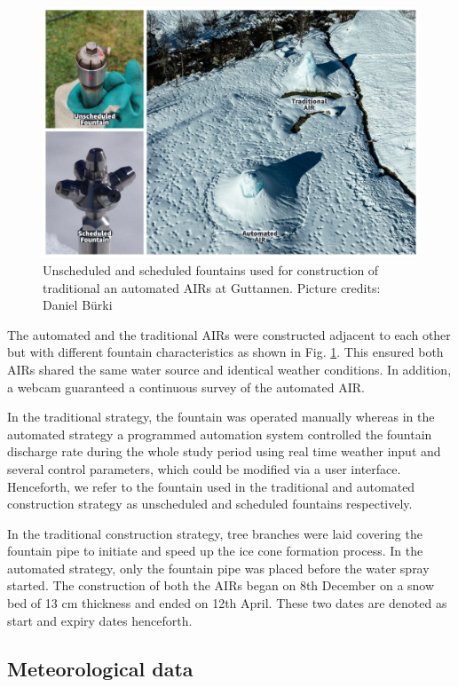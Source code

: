 \documentclass[tc, manuscript]{copernicus}
\begin{document}
\begin{figure}[t]
\includegraphics[width=12cm]{Figures/AIR_fountains.jpg}
\caption{Unscheduled and scheduled fountains used for construction of traditional an automated AIRs at Guttannen. Picture credits: Daniel Bürki}
\label{fig:2AIR}
\end{figure}

The automated and the traditional AIRs were constructed adjacent to each other but with different fountain
characteristics as shown in Fig. \ref{fig:2AIR}. This ensured both AIRs shared the same water source and
identical weather conditions. In addition, a webcam guaranteed a continuous survey of the automated AIR.   

In the traditional strategy, the fountain was operated manually whereas in the automated strategy a programmed
automation system controlled the fountain discharge rate during the whole study period using real time weather
input and several control parameters, which could be modified via a user interface. Henceforth, we refer to the
fountain used in the traditional and automated construction strategy as unscheduled and scheduled fountains
respectively.

In the traditional construction strategy, tree branches were laid covering the fountain pipe to initiate and
speed up the ice cone formation process. In the automated strategy, only the fountain pipe was placed before the
water spray started. The construction of both the AIRs began on 8th December on a snow bed of 13 cm thickness
and ended on 12th April. These two dates are denoted as start and expiry dates henceforth.

\subsection{Meteorological data}
\end{document}
